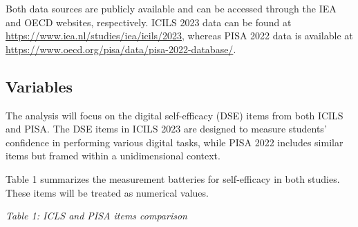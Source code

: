 \documentclass[
  letterpaper,
  DIV=11,
  numbers=noendperiod]{scrartcl}
\begin{document}
Both data sources are publicly available and can be accessed through the
IEA and OECD websites, respectively. ICILS 2023 data can be found at
\url{https://www.iea.nl/studies/iea/icils/2023}, whereas PISA 2022 data
is available at
\url{https://www.oecd.org/pisa/data/pisa-2022-database/}.

\subsection{Variables}\label{variables}

The analysis will focus on the digital self-efficacy (DSE) items from
both ICILS and PISA. The DSE items in ICILS 2023 are designed to measure
students' confidence in performing various digital tasks, while PISA
2022 includes similar items but framed within a unidimensional context.

Table 1 summarizes the measurement batteries for self-efficacy in both
studies. These items will be treated as numerical values.

\emph{Table 1: ICLS and PISA items comparison}
\end{document}
